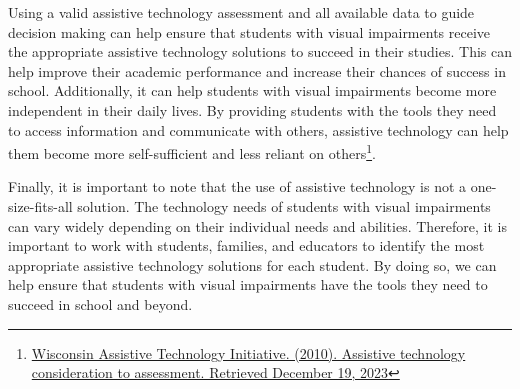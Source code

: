 Using a valid assistive technology assessment and all available data to guide decision making can help ensure that students with visual impairments receive the appropriate assistive technology solutions to succeed in their studies. This can help improve their academic performance and increase their chances of success in school. Additionally, it can help students with visual impairments become more independent in their daily lives. By providing students with the tools they need to access information and communicate with others, assistive technology can help them become more self-sufficient and less reliant on others\footnote{\raggedright \href{https://www.wati.org/free-publications/assistive-technology-consideration-to-assessment/}{Wisconsin Assistive Technology Initiative. (2010). Assistive technology consideration to assessment. Retrieved December 19, 2023}}.

Finally, it is important to note that the use of assistive technology is not a one-size-fits-all solution. The technology needs of students with visual impairments can vary widely depending on their individual needs and abilities. Therefore, it is important to work with students, families, and educators to identify the most appropriate assistive technology solutions for each student. By doing so, we can help ensure that students with visual impairments have the tools they need to succeed in school and beyond.

